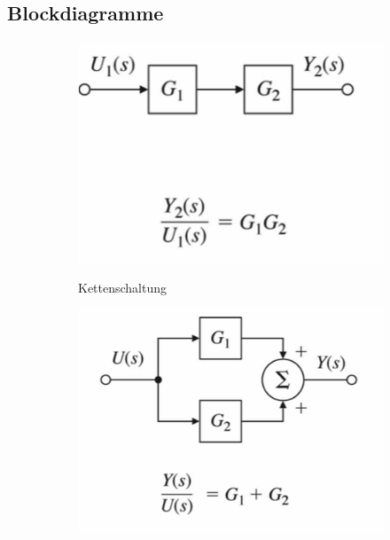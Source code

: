 \subsection{Blockdiagramme}
\begin{tcolorbox}[colback=white!10!white,colframe=blue!50!black,title=Regeln]
    
    \begin{figure}[H]
        \begin{subfigure}{.3\textwidth}
            \centering
            \includegraphics[width=1\textwidth]{images/kettenschaltung}
            \label{fig:kettenschaltung}
            \caption{Kettenschaltung}
        \end{subfigure}%
        \begin{subfigure}{.3\textwidth}
    \centering
    \includegraphics[width=1\textwidth]{images/parallel}

\end{subfigure}
\end{figure}
\end{tcolorbox}
